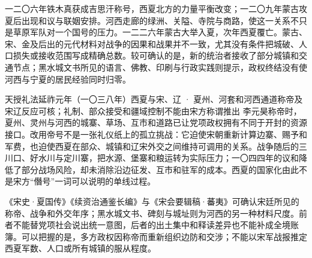 一二〇六年铁木真获成吉思汗称号，西夏北方的力量平衡改变；一二〇九年蒙古攻夏后出现和议与联姻安排。河西走廊的绿洲、关隘、寺院与商路，使这一关系不只是草原军队对一个国号的压力。一二二六年蒙古大举入夏，次年西夏覆亡。蒙古、宋、金及后出的元代材料对战争的因果和战果并不一致，尤其没有条件把城破、人口损失或接收范围写成精确总数。较可确认的是，新的统治者接收了部分城镇和交通节点；黑水城文书所见的语言、佛教、印刷与行政实践则提示，政权终结没有使河西与宁夏的居民经验同时归零。






\begin{event}{}{天授礼法延祚元年（一〇三八年）}{西夏与宋、辽 · 夏州、河套和河西通道}{称帝及宋辽反应可核；礼制、部众接受和疆域控制不能由宋方称谓推出}
李元昊称帝时，夏州、灵州与河西的城寨、草场、互市和道路已让党项政权拥有不同于开封的资源接口。改用帝号不是一张礼仪纸上的孤立挑战：它迫使宋朝重新计算边寨、赐予和军费，也迫使西夏在部众、城镇和辽宋外交之间维持可调用的关系。战争随后的三川口、好水川与定川寨，把水源、堡寨和粮运转为实际压力；一〇四四年的议和降低了部分战场风险，却未消除沿边征发、互市和驻军的成本。西夏的国家化由此不是宋方“僭号”一词可以说明的单线过程。

《宋史·夏国传》《续资治通鉴长编》与《宋会要辑稿·蕃夷》可确认宋廷所见的称帝、战争和外交年序；黑水城文书、碑刻与城址则为河西的另一种材料尺度。前者不能替党项社会说出统一意图，后者的出土集中和释读差异也不能补成全境账簿。可以把握的是，多方政权因称帝而重新组织边防和交涉；不能以宋军战报推定西夏军数、人口或所有城镇的服从程度。
\end{event}
